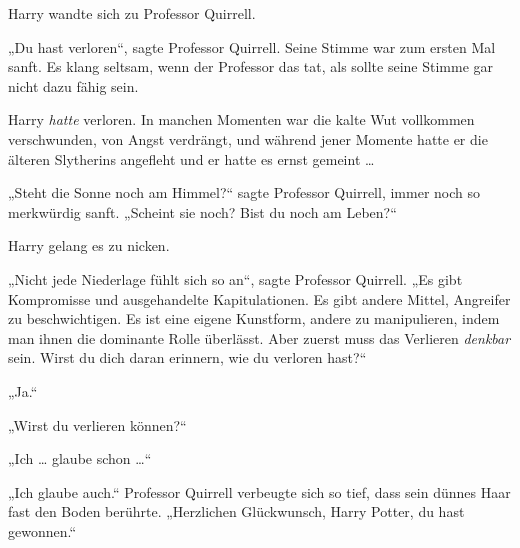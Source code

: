 Harry wandte sich zu Professor Quirrell.

„Du hast verloren“, sagte Professor Quirrell. Seine Stimme war zum ersten Mal sanft. Es klang seltsam, wenn der Professor das tat, als sollte seine Stimme gar nicht dazu fähig sein.

Harry \emph{hatte} verloren. In manchen Momenten war die kalte Wut vollkommen verschwunden, von Angst verdrängt, und während jener Momente hatte er die älteren Slytherins angefleht und er hatte es ernst gemeint …

„Steht die Sonne noch am Himmel?“ sagte Professor Quirrell, immer noch so merkwürdig sanft.
„Scheint sie noch? Bist du noch am Leben?“

Harry gelang es zu nicken.

„Nicht jede Niederlage fühlt sich so an“, sagte Professor Quirrell.
„Es gibt Kompromisse und ausgehandelte Kapitulationen. Es gibt andere Mittel, Angreifer zu beschwichtigen. Es ist eine eigene Kunstform, andere zu manipulieren, indem man ihnen die dominante Rolle überlässt. Aber zuerst muss das Verlieren \emph{denkbar} sein. Wirst du dich daran erinnern, wie du verloren hast?“

„Ja.“

„Wirst du verlieren können?“

„Ich … glaube schon …“

„Ich glaube auch.“ Professor Quirrell verbeugte sich so tief, dass sein dünnes Haar fast den Boden berührte.
„Herzlichen Glückwunsch, Harry Potter, du hast gewonnen.“

